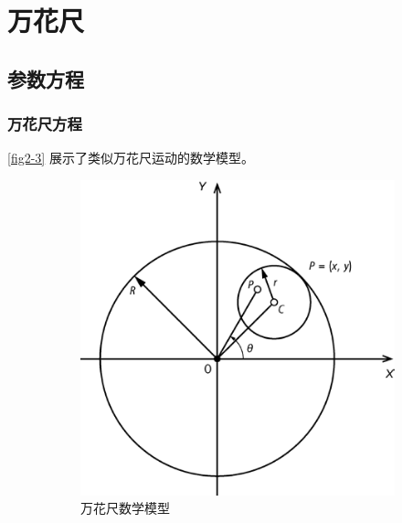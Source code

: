 \chapter{万花尺\label{ch02}}
\section{参数方程}
\subsection{万花尺方程}
\autoref{fig2-3} 展示了类似万花尺运动的数学模型。

\begin{figure}
    \centering
    \begin{subfigure}[b]{.45\textwidth}
        \centering
        \includegraphics[width=\textwidth]{../img/fig2-3.png}
        \caption{万花尺数学模型}
        \label{fig2-3}
    \end{subfigure}
    \hfill
    \begin{subfigure}[b]{.45\textwidth}
        \centering

\end{subfigure}
\end{figure}
